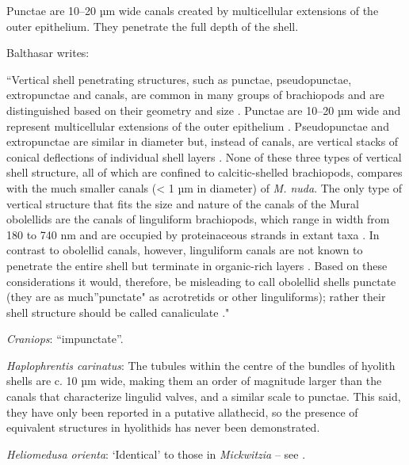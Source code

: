 \documentclass[openany]{book}
\theoremstyle{definition}
\theoremstyle{definition}
\theoremstyle{definition}
\theoremstyle{remark}
\begin{document}
Punctae are 10--20 µm wide canals created by multicellular extensions of
the outer epithelium. They penetrate the full depth of the shell.

Balthasar \citeyearpar{Balthasar2008iMummpikia} writes:

``Vertical shell penetrating structures, such as punctae, pseudopunctae,
extropunctae and canals, are common in many groups of brachiopods and
are distinguished based on their geometry and size
\citep{Williams1997Introduction}. Punctae are 10--20 µm wide and
represent multicellular extensions of the outer epithelium
\citep{Owen1969Thecaecum}. Pseudopunctae and extropunctae are similar in
diameter but, instead of canals, are vertical stacks of conical
deflections of individual shell layers \citep{Williams1993Roleof}. None
of these three types of vertical shell structure, all of which are
confined to calcitic-shelled brachiopods, compares with the much smaller
canals (\textless{} 1 µm in diameter) of \emph{M. nuda}. The only type
of vertical structure that fits the size and nature of the canals of the
Mural obolellids are the canals of linguliform brachiopods, which range
in width from 180 to 740 nm and are occupied by proteinaceous strands in
extant taxa
\citep{Williams1992Structureof, Williams1994Collagenouschitino, Williams1997Introduction}.
In contrast to obolellid canals, however, linguliform canals are not
known to penetrate the entire shell but terminate in organic-rich layers
\citep{Williams1997Introduction}. Based on these considerations it
would, therefore, be misleading to call obolellid shells punctate (they
are as much''punctate" as acrotretids or other linguliforms); rather
their shell structure should be called canaliculate
\citep{Williams1997Introduction}."

\hypertarget{Craniops-coding-115}{}
\emph{Craniops}: ``impunctate''.

\hypertarget{Haplophrentis_carinatus-coding-115}{}
\emph{Haplophrentis carinatus}: The tubules within the centre of the
bundles of hyolith shells \citep{Kouchinsky2000Skeletalmicrostructures}
are c. 10 µm wide, making them an order of magnitude larger than the
canals that characterize lingulid valves, and a similar scale to
punctae. This said, they have only been reported in a putative
allathecid, so the presence of equivalent structures in hyolithids has
never been demonstrated.

\hypertarget{Heliomedusa_orienta-coding-115}{}
\emph{Heliomedusa orienta}: `Identical' to those in \emph{Mickwitzia} --
see \citet{Williams2007Supplement}.
\end{document}
